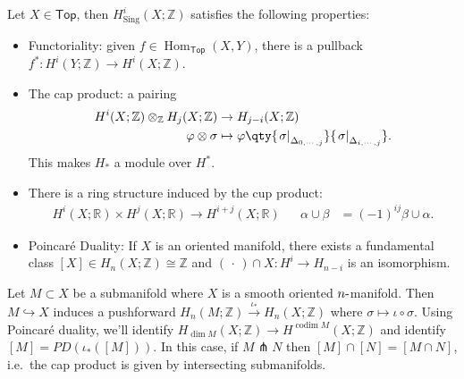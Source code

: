 \begin{theorem}

Let \(X\in {\mathsf{Top}}\), then
\(H_{{\operatorname{Sing}}}^i(X; {\mathbb{Z}})\) satisfies the following
properties:

\begin{itemize}
\item
  Functoriality: given
  \(f\in {\operatorname{Hom}}_{\mathsf{Top}}(X, Y)\), there is a
  pullback \(f^*: H^i(Y; {\mathbb{Z}}) \to H^i(X; {\mathbb{Z}})\).
\item
  The cap product: a pairing
  \begin{align*}
  H^i(X; {\mathbb{Z}}) \otimes_{\mathbb{Z}}H_j(X; {\mathbb{Z}}) &\to H_{j-i}(X; {\mathbb{Z}}) \\
  \varphi\otimes\sigma &\mapsto \varphi\qty{{ \left.{{\sigma}} \right|_{{\Delta_{0, \cdots, j}}} }} { \left.{{ \sigma}} \right|_{{\Delta_{i, \cdots, j}}} }
  .\end{align*}
  This makes \(H_*\) a module over \(H^*\).
\item
  There is a ring structure induced by the cup product:
  \begin{align*}
  H^i(X; {\mathbb{R}}) \times H^j(X; {\mathbb{R}})\to H^{i+j}(X; {\mathbb{R}}) && \alpha\cup \beta &= (-1)^{ij} \beta \cup \alpha
  .\end{align*}
\item
  Poincaré Duality: If \(X\) is an oriented manifold, there exists a
  fundamental class
  \([X] \in H_{n}(X; {\mathbb{Z}}) \cong {\mathbb{Z}}\) and
  \(({\,\cdot\,})\cap X: H^i \to H_{n-i}\) is an isomorphism.
\end{itemize}

\end{theorem}

\begin{remark}

Let \(M \subset X\) be a submanifold where \(X\) is a smooth oriented
\(n{\hbox{-}}\)manifold. Then \(M \hookrightarrow X\) induces a
pushforward
\(H_n(M; {\mathbb{Z}}) \xrightarrow{\iota_*} H_n(X; {\mathbb{Z}})\)
where \(\sigma \mapsto \iota \circ \sigma\). Using Poincaré duality,
we'll identify
\(H_{\dim M}(X; {\mathbb{Z}}) \to H^{\operatorname{codim}M}(X; {\mathbb{Z}})\)
and identify \([M] = PD( \iota_*( [M]))\). In this case, if
\(M\pitchfork N\) then \([M] \cap [N] = [M \cap N]\), i.e.~the cap
product is given by intersecting submanifolds.

\end{remark}


